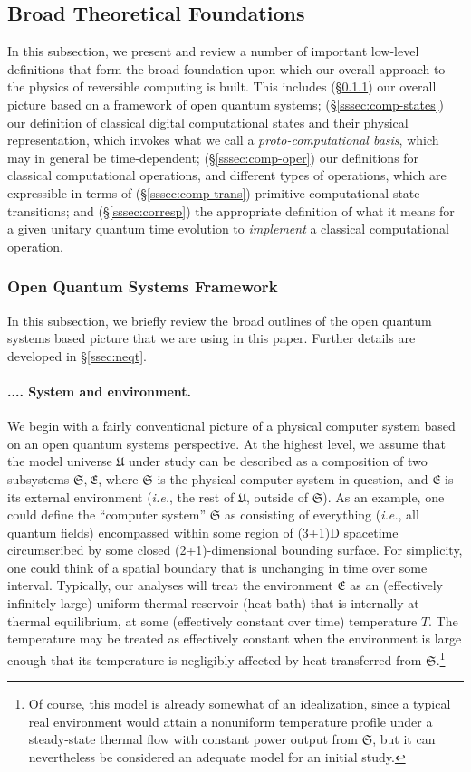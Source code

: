 \documentclass[preprints,article,accept,moreauthors,pdftex]{Definitions/mdpi}
\newcommand{\mypara}[1]{\paragraph{\arabic{section}.\arabic{subsection}.\arabic{subsubsection}.\arabic{paragraph}. #1}}
\begin{document}
\subsection{Broad Theoretical Foundations}
\label{ssec:found}

In this subsection, we present and review a number of important low-level definitions that form the broad foundation upon which our overall approach to the physics of reversible computing is built. This includes (\S\ref{sssec:open-q}) our overall picture based on a framework of open quantum systems; (\mbox{\S\ref{sssec:comp-states}}) our definition of classical digital computational states and their physical representation, which invokes what we call a {\em proto-computational basis}, which may in general be time-dependent; (\S\ref{sssec:comp-oper}) our definitions for classical computational operations, and different types of operations, which are expressible in terms of (\S\ref{sssec:comp-trans}) primitive computational state transitions; and (\mbox{\S\ref{sssec:corresp}}) the appropriate definition of what it means for a given unitary quantum time evolution to \textit{implement} a classical computational operation.

\subsubsection{Open Quantum Systems Framework}
\label{sssec:open-q}

In this subsection, we briefly review the broad outlines of the open quantum systems based picture that we are using in this paper. Further details are developed in \S\ref{ssec:neqt}.

\mypara{System and environment.}\label{par:sys-env}
We begin with a fairly conventional picture of a physical computer system based on an open quantum systems perspective. At the highest level, we assume that the model universe $\mathfrak{U}$ under study can be described as a composition of two subsystems $\mathfrak{S},\mathfrak{E}$, where $\mathfrak{S}$ is the physical computer system in question, and $\mathfrak{E}$ is its external environment (\emph{i.e.}, the rest of $\mathfrak{U}$, outside of $\mathfrak{S}$).
As an example, one could define the ``computer system'' $\mathfrak{S}$ as consisting of everything (\emph{i.e.}, all quantum fields) encompassed within some region of (3+1)D spacetime circumscribed by some closed (2+1)-dimensional bounding surface. For simplicity, one could think of a spatial boundary that is unchanging in time over some interval.
Typically, our analyses will treat the environment $\mathfrak{E}$ as an (effectively infinitely large) uniform thermal reservoir (heat bath) that is internally at thermal equilibrium, at some (effectively constant over time) temperature $T$\@. The temperature may be treated as effectively constant when the environment is large enough that its temperature is negligibly affected by heat transferred from $\mathfrak{S}$.\footnote{Of course, this model is already somewhat of an idealization, since a typical real environment would attain a nonuniform temperature profile under a steady-state thermal flow with constant power output from $\mathfrak{S}$, but it can nevertheless be considered an adequate model for an initial study.}
\end{document}
